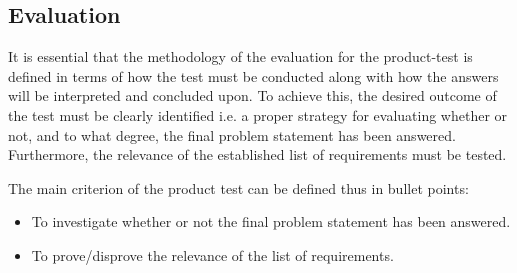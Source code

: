\subsection{Evaluation}
It is essential that the methodology of the evaluation for the product-test is defined in terms of how the test must be conducted along with how the answers will be interpreted and concluded upon. To achieve this, the desired outcome of the test must be clearly identified i.e. a proper strategy for evaluating whether or not, and to what degree, the final problem statement has been answered. Furthermore, the relevance of the established list of requirements must be tested.

The main criterion of the product test can be defined thus in bullet points:
\begin{itemize}
\item To investigate whether or not the final problem statement has been answered.
\item To prove/disprove the relevance of the list of requirements.
\end{itemize}



